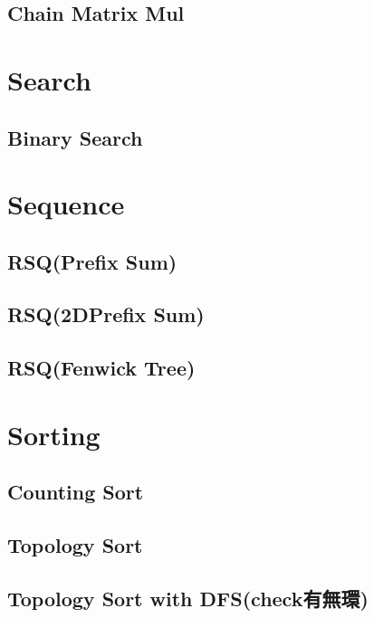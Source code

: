 \subsection{Chain Matrix Mul}

\section{Search}

\subsection{Binary Search}

\section{Sequence}

\subsection{RSQ(Prefix Sum)}


\subsection{RSQ(2DPrefix Sum)}


\subsection{RSQ(Fenwick Tree)}

\section{Sorting}

\subsection{Counting Sort}


\subsection{Topology Sort}


\subsection{Topology Sort with DFS(check有無環)}


